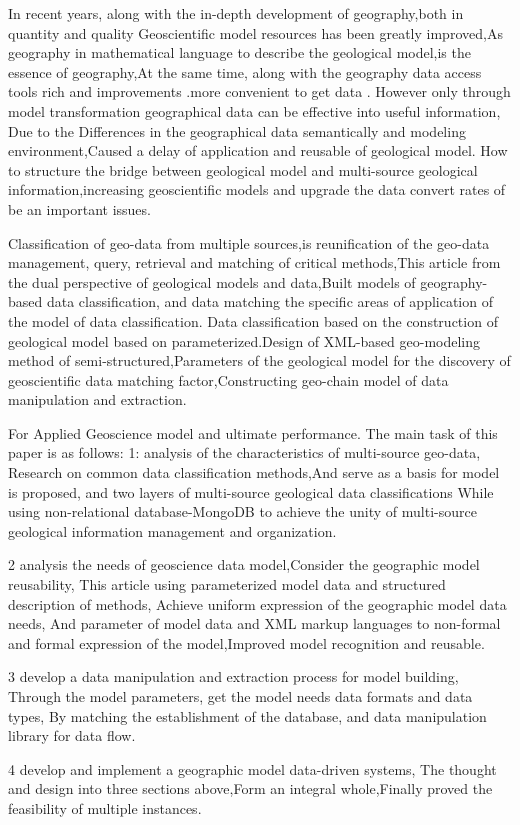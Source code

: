 {}
{
In recent years, along with the in-depth development of geography,both in quantity and quality Geoscientific model resources has been greatly improved,As geography in mathematical language to describe the geological model,is the essence of geography,At the same time, along with the geography data access tools rich  and improvements .more convenient to get data .
However only through model transformation  geographical data can be effective into useful information,
Due to the Differences in the geographical data semantically and modeling environment,Caused a delay of application and reusable of geological model.
How to structure the bridge between geological model and multi-source geological information,increasing geoscientific models and upgrade the data convert rates of be an  important issues.

Classification of geo-data from multiple sources,is reunification of the geo-data management, query, retrieval and matching of critical methods,This article from the dual perspective of geological models and data,Built models of geography-based data classification, and data matching the specific areas of application of the model of data classification.
Data classification based on the construction of geological model based on parameterized.Design of XML-based geo-modeling method of semi-structured,Parameters of the geological model for the discovery of geoscientific data matching factor,Constructing geo-chain model of data manipulation and extraction.

For Applied Geoscience model and ultimate performance.
The main task of this paper is as follows:
1: analysis of the characteristics of multi-source geo-data,
Research on common data classification methods,And serve as a basis for model is proposed, and two layers of multi-source geological data classifications
While using non-relational database-MongoDB to achieve the unity of multi-source geological information management and organization.

2 analysis the needs of geoscience data model,Consider the geographic model reusability,
This article using parameterized model data and structured description of methods,
Achieve uniform expression of the geographic model data needs,
And parameter of model data and XML markup languages to non-formal and formal expression of the model,Improved model recognition and reusable.

3 develop a data manipulation and extraction process for model building,
Through the model parameters, get the model needs data formats and data types,
By matching the establishment of the database, and data manipulation library for data flow.

4 develop and implement a geographic model data-driven systems, The thought and design into three sections above,Form an integral whole,Finally proved the feasibility of multiple instances.\\
\\
}
\vspace{10cm}
 
